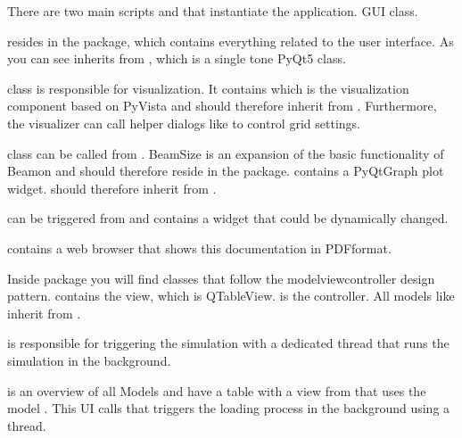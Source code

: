 \documentclass[letterpaper,10pt,english]{sphinxmanual}
\begin{document}
There are two main scripts  and  that instantiate the application.
GUI class.

 resides in the  package, which contains everything related to the user interface.
As you can see  inherits from , which is a single tone PyQt5 class.

 class is responsible for visualization. It contains  which is the visualization
component based on PyVista and should therefore inherit from .
Furthermore, the visualizer can call helper dialogs like  to control grid settings.

 class can be called from . BeamSize is an expansion of the basic functionality of Beamon and
should therefore reside in the  package.  contains a PyQtGraph plot widget. 
should therefore inherit from .

 can be triggered from  and contains a widget that could be dynamically changed.

 contains a web browser that shows this documentation in PDF\sphinxhyphen{}format.

Inside  package you will find classes that follow the model\sphinxhyphen{}view\sphinxhyphen{}controller design pattern. 
contains the view, which is QTableView.  is the controller. All models like  inherit
from .

 is responsible for triggering the simulation with a dedicated thread  that runs the simulation
in the background.

 is an overview of all Models and have a table with a view from  that uses the model
. This UI calls  that triggers the loading process in the background using a
thread.
\end{document}
